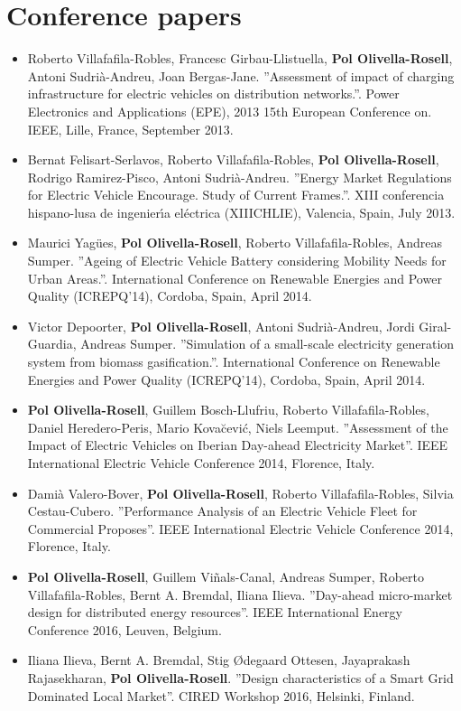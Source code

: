 \documentclass[a4paper,11pt,twoside,openright]{report}
\begin{document}
\section{Conference papers}
\begin{itemize}
\item Roberto Villafafila-Robles, Francesc Girbau-Llistuella, \textbf{Pol Olivella-Rosell}, Antoni Sudri\`{a}-Andreu, Joan Bergas-Jane.
''Assessment of impact of charging infrastructure for electric vehicles on distribution networks.''. 
Power Electronics and Applications (EPE), 2013 15th European Conference on. IEEE, Lille, France, September 2013.
\item Bernat Felisart-Serlavos, Roberto Villafafila-Robles, \textbf{Pol Olivella-Rosell}, Rodrigo Ramirez-Pisco, Antoni Sudri\`{a}-Andreu. ''Energy Market Regulations for Electric Vehicle Encourage. Study of Current Frames.''. XIII conferencia hispano-lusa de ingenier\'{\i}a el\'{e}ctrica (XIIICHLIE), Valencia, Spain, July 2013.
\item Maurici Yag\"{u}es, \textbf{Pol Olivella-Rosell}, Roberto Villafafila-Robles, Andreas Sumper. 
''Ageing of Electric Vehicle Battery considering Mobility Needs for Urban Areas.''. International Conference on Renewable Energies and Power Quality (ICREPQ'14), Cordoba, Spain, April 2014.
\item Victor Depoorter, \textbf{Pol Olivella-Rosell}, Antoni Sudri\`{a}-Andreu, Jordi Giral-Guardia, Andreas Sumper. 
''Simulation of a small-scale electricity generation system from biomass gasification.''. International Conference on Renewable Energies and Power Quality (ICREPQ'14), Cordoba, Spain, April 2014.
\item \textbf{Pol Olivella-Rosell}, Guillem Bosch-Llufriu, Roberto Villafafila-Robles, Daniel Heredero-Peris, Mario Kova\u{c}evi\'{c}, Niels Leemput. ''Assessment of the Impact of Electric Vehicles on Iberian Day-ahead Electricity Market''. IEEE International Electric Vehicle Conference 2014, Florence, Italy.
\item Dami\`{a} Valero-Bover, \textbf{Pol Olivella-Rosell}, Roberto Villafafila-Robles, Silvia Cestau-Cubero. ''Performance Analysis of an Electric Vehicle Fleet for Commercial Proposes''. IEEE International Electric Vehicle Conference 2014, Florence, Italy.
\item \textbf{Pol Olivella-Rosell}, Guillem Vi\~{n}als-Canal, Andreas Sumper, Roberto Villafafila-Robles, Bernt A. Bremdal, Iliana Ilieva. ''Day-ahead micro-market design for distributed energy resources''. IEEE International Energy Conference 2016, Leuven, Belgium.
\item Iliana Ilieva, Bernt A. Bremdal, Stig \O{}degaard Ottesen, Jayaprakash Rajasekharan, \textbf{Pol Olivella-Rosell}. ''Design characteristics of a Smart Grid Dominated Local Market''. CIRED Workshop 2016, Helsinki, Finland.
\end{itemize}
\end{document}
